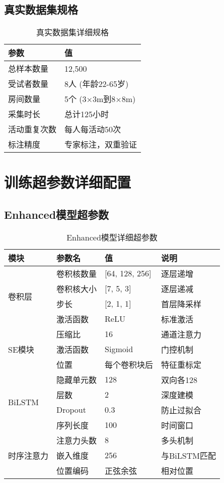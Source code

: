 \subsection{真实数据集规格}
\label{app:real_specs}

\begin{table}[h]
\centering
\caption{真实数据集详细规格}
\label{tab:real_dataset_specs}
\begin{tabular}{ll}
\toprule
\textbf{参数} & \textbf{值} \\
\midrule
总样本数量 & 12,500 \\
受试者数量 & 8人 (年龄22-65岁) \\
房间数量 & 5个 (3×3m到8×8m) \\
采集时长 & 总计125小时 \\
活动重复次数 & 每人每活动50次 \\
标注精度 & 专家标注，双重验证 \\
\bottomrule
\end{tabular}
\end{table}

\section{训练超参数详细配置}
\label{app:hyperparameters}

\subsection{Enhanced模型超参数}
\label{app:enhanced_hyperparams}

\begin{table}[h]
\centering
\caption{Enhanced模型详细超参数}
\label{tab:enhanced_hyperparams}
\begin{tabular}{llll}
\toprule
\textbf{模块} & \textbf{参数名} & \textbf{值} & \textbf{说明} \\
\midrule
\multirow{4}{*}{卷积层}
& 卷积核数量 & [64, 128, 256] & 逐层递增 \\
& 卷积核大小 & [7, 5, 3] & 逐层递减 \\
& 步长 & [2, 1, 1] & 首层降采样 \\
& 激活函数 & ReLU & 标准激活 \\
\midrule
\multirow{3}{*}{SE模块}
& 压缩比 & 16 & 通道注意力 \\
& 激活函数 & Sigmoid & 门控机制 \\
& 位置 & 每个卷积块后 & 特征重标定 \\
\midrule
\multirow{4}{*}{BiLSTM}
& 隐藏单元数 & 128 & 双向各128 \\
& 层数 & 2 & 深度建模 \\
& Dropout & 0.3 & 防止过拟合 \\
& 序列长度 & 100 & 时间窗口 \\
\midrule
\multirow{3}{*}{时序注意力}
& 注意力头数 & 8 & 多头机制 \\
& 嵌入维度 & 256 & 与BiLSTM匹配 \\
& 位置编码 & 正弦余弦 & 相对位置 \\
\bottomrule
\end{tabular}
\end{table}

